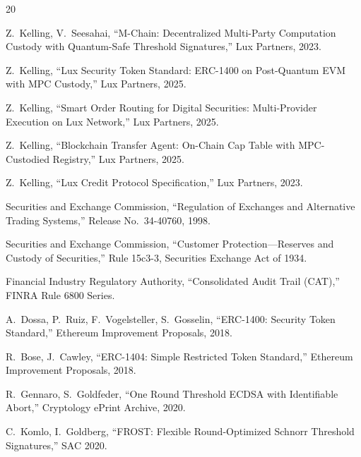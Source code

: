 \documentclass[11pt,a4paper]{article}
\begin{document}
\begin{thebibliography}{20}

Z.~Kelling, V.~Seesahai,
``M-Chain: Decentralized Multi-Party Computation Custody with Quantum-Safe Threshold Signatures,''
Lux Partners, 2023.

Z.~Kelling,
``Lux Security Token Standard: ERC-1400 on Post-Quantum EVM with MPC Custody,''
Lux Partners, 2025.

Z.~Kelling,
``Smart Order Routing for Digital Securities: Multi-Provider Execution on Lux Network,''
Lux Partners, 2025.

Z.~Kelling,
``Blockchain Transfer Agent: On-Chain Cap Table with MPC-Custodied Registry,''
Lux Partners, 2025.

Z.~Kelling,
``Lux Credit Protocol Specification,''
Lux Partners, 2023.

Securities and Exchange Commission,
``Regulation of Exchanges and Alternative Trading Systems,''
Release No.~34-40760, 1998.

Securities and Exchange Commission,
``Customer Protection---Reserves and Custody of Securities,''
Rule 15c3-3, Securities Exchange Act of 1934.

Financial Industry Regulatory Authority,
``Consolidated Audit Trail (CAT),''
FINRA Rule 6800 Series.

A.~Dossa, P.~Ruiz, F.~Vogelsteller, S.~Gosselin,
``ERC-1400: Security Token Standard,''
Ethereum Improvement Proposals, 2018.

R.~Bose, J.~Cawley,
``ERC-1404: Simple Restricted Token Standard,''
Ethereum Improvement Proposals, 2018.

R.~Gennaro, S.~Goldfeder,
``One Round Threshold ECDSA with Identifiable Abort,''
Cryptology ePrint Archive, 2020.

C.~Komlo, I.~Goldberg,
``FROST: Flexible Round-Optimized Schnorr Threshold Signatures,''
SAC 2020.

\end{thebibliography}
\end{document}
